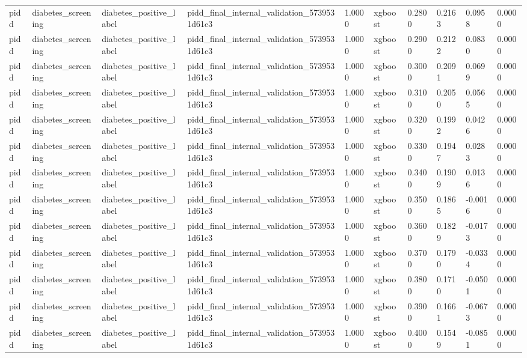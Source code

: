 \begin{tabular}{llllllllll}
pidd & diabetes\_screening & diabetes\_positive\_label & pidd\_final\_internal\_validation\_5739531d61c3 & 1.0000 & xgboost & 0.2800 & 0.2163 & 0.0958 & 0.0000 \\
pidd & diabetes\_screening & diabetes\_positive\_label & pidd\_final\_internal\_validation\_5739531d61c3 & 1.0000 & xgboost & 0.2900 & 0.2122 & 0.0830 & 0.0000 \\
pidd & diabetes\_screening & diabetes\_positive\_label & pidd\_final\_internal\_validation\_5739531d61c3 & 1.0000 & xgboost & 0.3000 & 0.2091 & 0.0699 & 0.0000 \\
pidd & diabetes\_screening & diabetes\_positive\_label & pidd\_final\_internal\_validation\_5739531d61c3 & 1.0000 & xgboost & 0.3100 & 0.2050 & 0.0565 & 0.0000 \\
pidd & diabetes\_screening & diabetes\_positive\_label & pidd\_final\_internal\_validation\_5739531d61c3 & 1.0000 & xgboost & 0.3200 & 0.1992 & 0.0426 & 0.0000 \\
pidd & diabetes\_screening & diabetes\_positive\_label & pidd\_final\_internal\_validation\_5739531d61c3 & 1.0000 & xgboost & 0.3300 & 0.1947 & 0.0283 & 0.0000 \\
pidd & diabetes\_screening & diabetes\_positive\_label & pidd\_final\_internal\_validation\_5739531d61c3 & 1.0000 & xgboost & 0.3400 & 0.1909 & 0.0136 & 0.0000 \\
pidd & diabetes\_screening & diabetes\_positive\_label & pidd\_final\_internal\_validation\_5739531d61c3 & 1.0000 & xgboost & 0.3500 & 0.1865 & -0.0016 & 0.0000 \\
pidd & diabetes\_screening & diabetes\_positive\_label & pidd\_final\_internal\_validation\_5739531d61c3 & 1.0000 & xgboost & 0.3600 & 0.1829 & -0.0173 & 0.0000 \\
pidd & diabetes\_screening & diabetes\_positive\_label & pidd\_final\_internal\_validation\_5739531d61c3 & 1.0000 & xgboost & 0.3700 & 0.1790 & -0.0334 & 0.0000 \\
pidd & diabetes\_screening & diabetes\_positive\_label & pidd\_final\_internal\_validation\_5739531d61c3 & 1.0000 & xgboost & 0.3800 & 0.1710 & -0.0501 & 0.0000 \\
pidd & diabetes\_screening & diabetes\_positive\_label & pidd\_final\_internal\_validation\_5739531d61c3 & 1.0000 & xgboost & 0.3900 & 0.1661 & -0.0673 & 0.0000 \\
pidd & diabetes\_screening & diabetes\_positive\_label & pidd\_final\_internal\_validation\_5739531d61c3 & 1.0000 & xgboost & 0.4000 & 0.1549 & -0.0851 & 0.0000 \\

\end{tabular}
